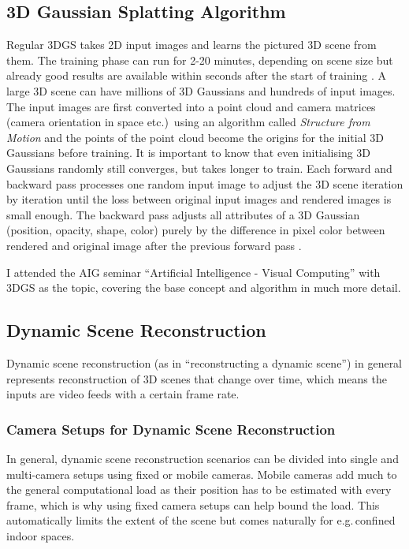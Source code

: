 \subsection{3D Gaussian Splatting Algorithm}
Regular 3DGS takes 2D input images and learns the pictured 3D scene from them. The training phase can run for 2-20 minutes, depending on scene size but already good results are available within seconds after the start of training \cite{kerbl3DGaussianSplatting2023}. A large 3D scene can have millions of 3D Gaussians and hundreds of input images.
The input images are first converted into a point cloud and camera matrices (camera orientation in space etc.)\ using an algorithm called \textit{Structure from Motion} \cite{ullmanInterpretationStructureMotion1979} and the points of the point cloud become the origins for the initial 3D Gaussians before training.
It is important to know that even initialising 3D Gaussians randomly still converges, but takes longer to train.
Each forward and backward pass processes one random input image to adjust the 3D scene iteration by iteration until the loss between original input images and rendered images is small enough.
The backward pass adjusts all attributes of a 3D Gaussian (position, opacity, shape, color) purely by the difference in pixel color between rendered and original image after the previous forward pass \cite{kerbl3DGaussianSplatting2023, kerblRepo}.

I attended the AIG seminar \enquote{Artificial Intelligence - Visual Computing} with 3DGS as the topic, covering the base concept and algorithm in much more detail.

\subsection{Dynamic Scene Reconstruction}
Dynamic scene reconstruction (as in \enquote{reconstructing a dynamic scene}) in general represents reconstruction of 3D scenes that change over time, which means the inputs are video feeds with a certain frame rate. 

\subsubsection{Camera Setups for Dynamic Scene Reconstruction}
\label{ch:camera}
In general, dynamic scene reconstruction scenarios can be divided into single and multi-camera setups using fixed or mobile cameras. Mobile cameras add much to the general computational load as their position has to be estimated with every frame, which is why using fixed camera setups can help bound the load. This automatically limits the extent of the scene but comes naturally for e.g.\,confined indoor spaces.

